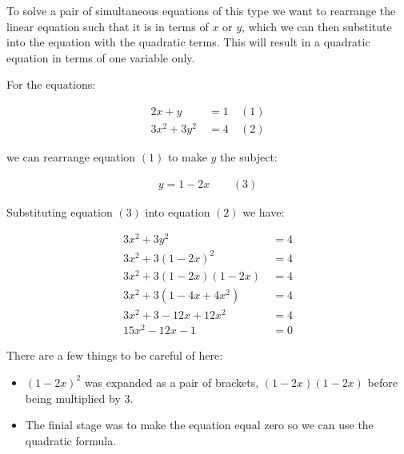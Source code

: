 \documentclass[
  a4paper,
]{scrbook}
\providecommand{\tightlist}{%
  \setlength{\itemsep}{0pt}\setlength{\parskip}{0pt}}
\begin{document}
To solve a pair of simultaneous equations of this type we want to
rearrange the linear equation such that it is in terms of \(x\) or
\(y\), which we can then substitute into the equation with the quadratic
terms. This will result in a quadratic equation in terms of one variable
only.

For the equations:

\[
\begin{aligned} 2x+y &\ = 1  &\ (1) \\ 
3x^2+3y^2 &\ = 4 &\ (2)
\end{aligned}
\]

we can rearrange equation \((1)\) to make \(y\) the subject:

\[
\begin{aligned} y = 1-2x &\ &\ (3) \end{aligned}
\]

Substituting equation \((3)\) into equation \((2)\) we have:

\[
\begin{aligned}
3x^2+3y^2 &\ = 4 \\
3x^2+3(1-2x)^2 &\ = 4 \\
3x^2 + 3 (1-2x)(1-2x) &\ = 4 \\
3x^2+3(1-4x+4x^2) &\ = 4 \\
3x^2+3-12x+12x^2 &\ = 4 \\
15x^2-12x-1 &\ = 0
\end{aligned}
\]

\begin{tcolorbox}[enhanced jigsaw, arc=.35mm, bottomrule=.15mm, bottomtitle=1mm, breakable, colback=white, colbacktitle=quarto-callout-warning-color!10!white, colframe=quarto-callout-warning-color-frame, coltitle=black, left=2mm, leftrule=.75mm, opacityback=0, opacitybacktitle=0.6, rightrule=.15mm, title=\textcolor{quarto-callout-warning-color}{\faExclamationTriangle}\hspace{0.5em}{Warning}, titlerule=0mm, toprule=.15mm, toptitle=1mm]

There are a few things to be careful of here:

\begin{itemize}
\tightlist
\item
  \((1-2x)^2\) was expanded as a pair of brackets, \((1-2x)(1-2x)\)
  before being multiplied by \(3\).
\item
  The finial stage was to make the equation equal zero so we can use the
  quadratic formula.
\end{itemize}

\end{tcolorbox}
\end{document}
